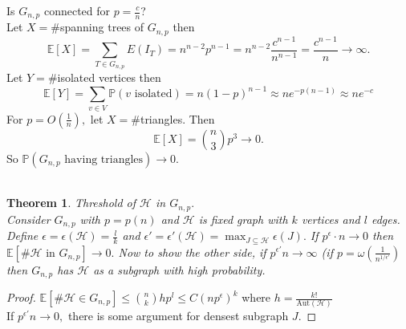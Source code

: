 \documentclass[a4paper]{article}
\newtheorem{thm}{Theorem}[section]
\begin{document}
Is $G_{n,p}$ connected for $p=\frac{c}{n}$?\\
Let $X=\#$spanning trees of $G_{n,p}$ then $$\mathbb{E}[X]=\sum_{T\in G_{n,p}}E(I_T)=n^{n-2}p^{n-1}=n^{n-2}\frac{c^{n-1}}{n^{n-1}}=\frac{c^{n-1}}{n}\to \infty.$$
Let $Y=\#$isolated vertices then $$\mathbb{E}[Y]=\sum_{v\in V}\mathbb{P}(v \text{ isolated})=n(1-p)^{n-1}\approx ne^{-p(n-1)}\approx ne^{-c}$$
For $p=O\left (\frac{1}{n} \right ),$ let $X=\#$triangles. Then $$\mathbb{E}[X]={n \choose 3}p^3\to 0.$$
So $\mathbb{P}(G_{n,p} \text{ having triangles})\to 0.$ \\\\
\begin{thm}
    Threshold of $\mathcal{H}$ in $G_{n,p}.$\\
    Consider $G_{n,p}$ with $p=p(n)$ and $\mathcal{H}$ is fixed graph with $k$ vertices and $l$ edges.\\
    Define $\epsilon = \epsilon(\mathcal{H})=\frac{l}{k}$ and $\epsilon'=\epsilon'(\mathcal{H})=\max_{J\subseteq \mathcal{H}}\epsilon(J).$
    If $p^\epsilon \cdot n\to 0$ then $\mathbb{E}[\#\mathcal{H} \text{ in } G_{n,p}]\to 0.$
    \noindent Now to show the other side, if $p^{\epsilon'}n\to \infty$ (if $p=\omega\left (\frac{1}{n^{1/\epsilon'}} \right )$ then $G_{n,p}$ has $\mathcal{H}$ as a subgraph with high probability.
\end{thm}
\begin{proof}
    $\mathbb{E}[\#\mathcal{H}\in G_{n,p}]\leq {n \choose k}hp^l\leq C(np^\epsilon)^k$ where $h=\frac{k!}{\text{Aut}(\mathcal{H})}$\\
    If $p^{\epsilon'}n\to 0,$ there is some argument for densest subgraph $J.$
\end{proof}        
\end{document}
